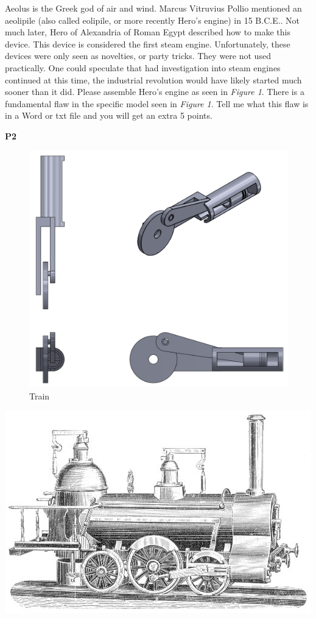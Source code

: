 \documentclass{article}
\begin{document}
{\noindent Aeolus is the Greek god of air and wind. Marcus Vitruvius Pollio mentioned an aeolipile (also called eolipile, or more recently Hero’s engine) in 15 B.C.E.. Not much later, Hero of Alexandria of Roman Egypt described how to make this device. This device is considered the first steam engine. Unfortunately, these devices were only seen as novelties, or party tricks. They were not used practically. One could speculate that had investigation into steam engines continued at this time, the industrial revolution would have likely started much sooner than it did. Please assemble Hero’s engine as seen in \textit{Figure 1}. There is a fundamental flaw in the specific model seen in \textit{Figure 1}. Tell me what this flaw is in a Word or txt file and you will get an extra 5 points. 

\textbf{P2}\\[0mm]
\begin{minipage}[c]{.75\linewidth}
\begin{figure}[H]
  \centering
  \includegraphics[width=.67\linewidth]{images/2.png}  
  \caption{Train}
  \label{fig:3}
\end{figure}
\vspace{1mm}
\end{minipage}
\begin{minipage}[c]{.25\linewidth}
\includegraphics[width=\linewidth]{images/2b.jpg}

\end{minipage}}
\end{document}
